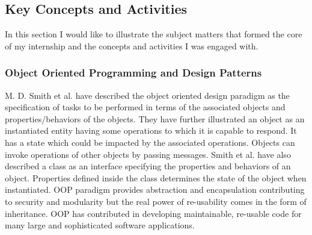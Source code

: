 \subsection{Key Concepts and Activities}
In this section I would like to illustrate the subject  matters that formed the core of my internship and the concepts and activities I was engaged with.

\subsubsection{Object Oriented Programming and Design Patterns}
M. D. Smith et al. \cite{smith2011object} have described the object oriented design paradigm as the specification of tasks to be performed in terms of the associated objects and properties/behaviors of the objects. They have further illustrated an object as an instantiated entity having some operations to which it is capable to respond. It has a state which could be impacted by the associated operations. Objects can invoke operations of other objects by passing messages. Smith et al. \cite{smith2011object} have also described a class as an interface specifying the properties and behaviors of an object. Properties defined inside the class determines the state of the object when instantiated. OOP paradigm provides abstraction and encapsulation contributing to security and modularity but the real power of re-usability comes in the form of inheritance. OOP has contributed in developing maintainable, re-usable code for many large and sophisticated software applications. 

